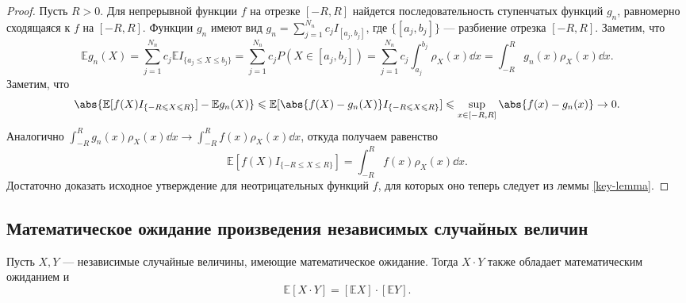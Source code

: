 \begin{proof}
    Пусть $R > 0$.
    Для непрерывной функции $f$ на отрезке $[-R, R]$ найдется последовательность ступенчатых функций $g_n$, равномерно сходящаяся к $f$ на $[-R, R]$.
    Функции $g_n$ имеют вид $g_n = \sum\limits_{j = 1}^{N_n} c_j I_{[a_j, b_j]}$, где $\{[a_j, b_j]\}$ --- разбиение отрезка $[-R, R]$.
    Заметим, что
    \[
        \mathbb{E} g_n(X) = \sum\limits_{j = 1}^{N_n} c_j \mathbb{E}I_{\{a_j \leqslant X \leqslant b_j\}} = \sum\limits_{j = 1}^{N_n} c_j P(X \in [a_j, b_j]) = \sum\limits_{j = 1}^{N_n} c_j \int_{a_j}^{b_j} \rho_X(x) \dd x = \int_{-R}^R g_n(x) \rho_X(x) \dd x.
    \]
    Заметим, что
    \[
        \abs{\mathbb{E}[f(X) I_{\{-R \leqslant X \leqslant R\}}] - \mathbb{E}g_n(X)} \leqslant \mathbb{E}[\abs{f(X) - g_n(X)}I_{\{-R \leqslant X \leqslant R\}}] \leqslant \sup\limits_{x \in [-R, R]}\abs{f(x) - g_n(x)} \to 0.
    \]
    Аналогично $\displaystyle\int_{-R}^R g_n(x) \rho_X(x) \dd x \to \int_{-R}^R f(x) \rho_X(x) \dd x$, откуда получаем равенство
    \[
        \mathbb{E}[f(X) I_{\{-R \leqslant X \leqslant R\}}] = \int_{-R}^R f(x)\rho_X(x) \dd x.
    \]
    Достаточно доказать исходное утверждение для неотрицательных функций $f$, для которых оно теперь следует из леммы \ref{key-lemma}.
\end{proof}

\sectionbreak
\subsection{Математическое ожидание произведения независимых случайных величин}

\begin{proposal*}
    Пусть $X, Y$ --- независимые случайные величины, имеющие математическое ожидание.
    Тогда $X \cdot Y$ также обладает математическим ожиданием и
    \[
        \mathbb{E}[X\cdot Y] = [\mathbb{E}X]\cdot[\mathbb{E}Y].
    \]
\end{proposal*}

